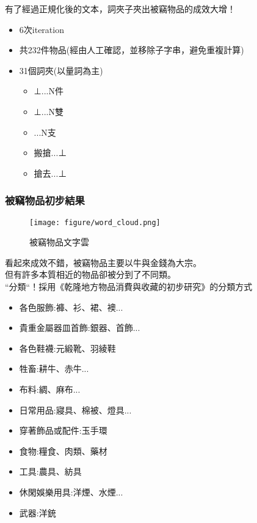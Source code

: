 \documentclass{beamer}
\begin{document}
\begin{frame}
    有了經過正規化後的文本，詞夾子夾出被竊物品的成效大增！
        \begin{itemize}
        \item 6次iteration
        \item 共232件物品(經由人工確認，並移除子字串，避免重複計算)
        \item 31個詞夾(以量詞為主)
        \begin{itemize}
            \item ⊥...N件
            \item ⊥...N雙
            \item ...N支
            \item 搬搶...⊥
            \item 搶去...⊥
        \end{itemize}
        \end{itemize}
\end{frame}

\begin{frame}
\frametitle{被竊物品初步結果}
\begin{figure}[H]
    	\begin{center}
        	\texttt{[image: figure/word\_cloud.png]}
			\caption{被竊物品文字雲}
    	\end{center}
	\end{figure}
\end{frame}

\begin{frame}
    看起來成效不錯，被竊物品主要以牛與金錢為大宗。\\但有許多本質相近的物品卻被分到了不同類。\\
    \MVRightarrow{}``分類``！採用《乾隆地方物品消費與收藏的初步研究》的分類方式
    \begin{itemize}
        \item 各色服飾:褲、衫、裙、襖...
        \item 貴重金屬器皿首飾:銀器、首飾...
        \item 各色鞋襪:元緞靴、羽綾鞋
        \item 牲畜:耕牛、赤牛...
        \item 布料:綢、麻布...
        \item 日常用品:寢具、棉被、燈具...
        \item 穿著飾品或配件:玉手環
        \item 食物:糧食、肉類、藥材
        \item 工具:農具、紡具
        \item 休閑娛樂用具:洋煙、水煙...
        \item 武器:洋銃
    \end{itemize}
\end{frame}
\end{document}

